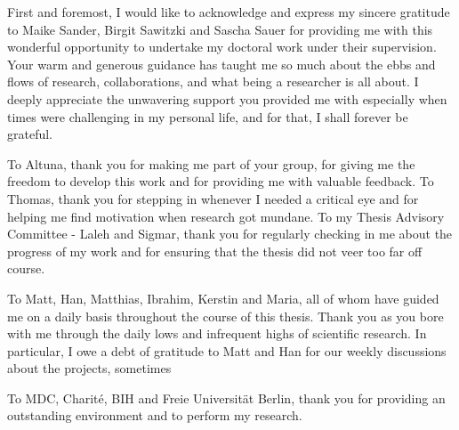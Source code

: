 
\begin{acknowledgements}      



\par First and foremost, I would like to acknowledge and express my sincere gratitude to Maike Sander, Birgit Sawitzki and Sascha Sauer for providing me with this wonderful opportunity to undertake my doctoral work under their supervision. Your warm and generous guidance has taught me so much about the ebbs and flows of research, collaborations, and what being a researcher is all about. I deeply appreciate the unwavering support you provided me with especially when times were challenging in my personal life, and for that, I shall forever be grateful.\\

\par To Altuna, thank you for making me part of your group, for giving me the freedom to develop this work and for providing me with valuable feedback. To Thomas, thank you for stepping in whenever I needed a critical eye and for helping me find motivation when research got mundane. To my Thesis Advisory Committee - Laleh and Sigmar, thank you for regularly checking in me about the progress of my work and for ensuring that the thesis did not veer too far off course.\\

\par To Matt, Han, Matthias, Ibrahim, Kerstin and Maria, all of whom have guided me on a daily basis throughout the course of this thesis. Thank you as you bore with me through the daily lows and infrequent highs of scientific research. In particular, I owe a debt of gratitude to Matt and Han for our weekly discussions about the projects, sometimes\\

\par To MDC, Charité, BIH and Freie Universität Berlin, thank you for providing an outstanding environment and to perform my research.\\


\end{acknowledgements}
